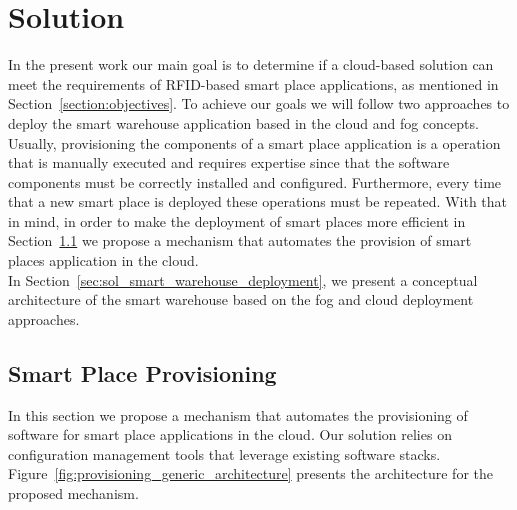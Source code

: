 
\chapter{Solution}
\label{chapter:solution}
In the present work our main goal is to determine if a cloud-based solution can meet the
requirements of RFID-based smart place applications, as mentioned in Section~\ref{section:objectives}.
To achieve our goals we will follow two approaches to deploy the smart warehouse application based
in the cloud and fog concepts.\\

Usually, provisioning the components of a smart place application is a operation that is manually executed and
requires expertise since that the software components must be correctly installed and configured.
Furthermore, every time that a new smart place is deployed these operations must be repeated. With
that in mind, in order to make the deployment of smart places more efficient in Section~\ref{sec:sol_provisioning}
we propose a mechanism that automates the provision of smart places application in the cloud.\\

In Section~\ref{sec:sol_smart_warehouse_deployment}, we present a conceptual architecture of the
smart warehouse based on the fog and cloud deployment approaches.

\section{Smart Place Provisioning}
\label{sec:sol_provisioning}
In this section we propose a mechanism that automates the provisioning of software for smart place
applications in the cloud. Our solution relies on configuration management tools that leverage
existing software stacks. Figure~\ref{fig:provisioning_generic_architecture} presents the architecture
for the proposed mechanism.\\

